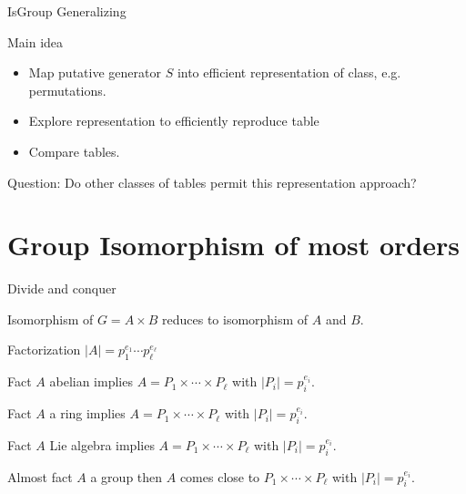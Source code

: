 \documentclass{beamer}
\begin{document}
\begin{frame}{IsGroup Generalizing}

\begin{block}{Main idea}
\begin{itemize}
    \item Map putative generator $S$ into efficient representation of class, e.g. permutations.
    \item Explore representation to efficiently reproduce table
    \item Compare tables.
\end{itemize}
\end{block}

\begin{block}{Question:}
Do other classes of tables permit this representation approach?
\end{block}


\end{frame}


\section{Group Isomorphism of most orders}

\begin{frame}{Divide and conquer}

Isomorphism of $G=A\times B$ reduces to isomorphism of $A$ and $B$.
\end{frame}

\begin{frame}{Factorization}
$|A|=p_1^{e_1}\cdots p_{\ell}^{e_{\ell}}$

\begin{block}{Fact}
    $A$ abelian implies $A=P_1\times \cdots \times P_{\ell}$ with $|P_i|=p_i^{e_i}$.
\end{block}

\begin{block}{Fact}
    $A$ a ring implies $A=P_1\times \cdots \times P_{\ell}$ with $|P_i|=p_i^{e_i}$.
\end{block}

\begin{block}{Fact}
    $A$ Lie algebra implies $A=P_1\times \cdots \times P_{\ell}$ with $|P_i|=p_i^{e_i}$.
\end{block}


\begin{block}{Almost fact}
    $A$ a group then $A$ comes close to 
    $P_1\times \cdots \times P_{\ell}$ with $|P_i|=p_i^{e_i}$.
\end{block}

\end{frame}
\end{document}
